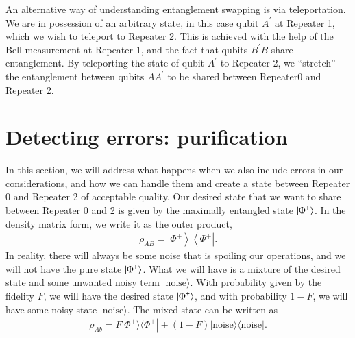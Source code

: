 An alternative way of understanding entanglement swapping is via teleportation.
We are in possession of an arbitrary state, in this case qubit $A^{\prime}$ at Repeater 1, which we wish to teleport to Repeater 2.
This is achieved with the help of the Bell measurement at Repeater 1, and the fact that qubits $B^{\prime}B$ share entanglement.
By teleporting the state of qubit $A^{\prime}$ to Repeater 2, we ``stretch'' the entanglement between qubits $AA^{\prime}$ to be shared between Repeater0 and Repeater 2.


\section{Detecting errors: purification}
\label{sec:12-4_purification}

In this section, we will address what happens when we also include errors in our considerations, and how we can handle them and create a state between Repeater 0 and Repeater 2 of acceptable quality.
Our desired state that we want to share between Repeater 0 and 2 is given by the maximally entangled state $\left| \Phi^+ \right\rangle$.
In the density matrix form, we write it as the outer product,
\begin{align}
    \rho_{AB} = \left|\Phi^{+}\right\rangle\left\langle\Phi^{+}\right|.
\end{align}
In reality, there will always be some noise that is spoiling our operations, and we will not have the pure state $\left| \Phi^+ \right\rangle$.
What we will have is a mixture of the desired state and some unwanted noisy term $|\text{noise}\rangle$.
With probability given by the fidelity $F$, we will have the desired state $\left| \Phi^+ \right\rangle$, and with probability $1-F$, we will have some noisy state $|\text{noise}\rangle$.
The mixed state can be written as
\begin{align}
    \rho_{Ab} = F |\Phi^{+}\rangle\langle\Phi^{+}|+(1-F)| \text {noise}\rangle\langle\text {noise}|.
\end{align}

